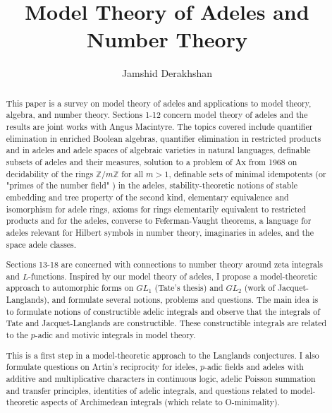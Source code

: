 \documentclass[12pt]{amsart}
\title{Model Theory of Adeles and Number Theory}
\author[J. Derakhshan]{Jamshid Derakhshan}
\def\Z{\mathbb{Z}}
\numberwithin{equation}{section}
\begin{document}
\keywords{}

    
  

\begin{abstract} 
This paper is a survey on model theory of adeles and applications to model theory, algebra, and 
number theory. Sections 1-12 concern model theory of adeles and the results are joint works with Angus Macintyre. The topics covered include quantifier elimination in enriched Boolean algebras, quantifier elimination in restricted products and in adeles and adele spaces of algebraic varieties in natural languages, definable subsets of adeles and their measures, solution to a problem of Ax from 1968 on decidability of the rings $\Z/m\Z$ for all $m>1$, definable sets of minimal idempotents (or  "primes of the number field" ) in the adeles, stability-theoretic notions of stable embedding and tree property of the second kind, elementary equivalence and isomorphism for adele rings, axioms for rings elementarily equivalent to restricted products and for the adeles, converse to Feferman-Vaught theorems, a language for adeles relevant for Hilbert symbols in number theory, imaginaries in adeles, and the space adele classes. 

Sections 13-18 are concerned with connections to number theory around zeta integrals and 
$L$-functions. Inspired by our model theory of adeles, I propose a model-theoretic approach to automorphic forms on $GL_1$ (Tate's thesis) and 
$GL_2$ (work of Jacquet-Langlands), and formulate several notions, problems and questions. The main idea is to formulate notions of constructible adelic integrals  and observe that the integrals of Tate and Jacquet-Langlands are constructible. These constructible integrals are related to the $p$-adic and motivic integrals in model theory. 

This is a first step in a model-theoretic approach to the Langlands conjectures. I also formulate questions on 
Artin's reciprocity for ideles, $p$-adic fields and adeles with additive and multiplicative characters in continuous logic, adelic Poisson summation and transfer principles, identities of adelic integrals, and questions related to model-theoretic aspects of Archimedean integrals (which relate to O-minimality).

\end{abstract}

\maketitle
\end{document}
